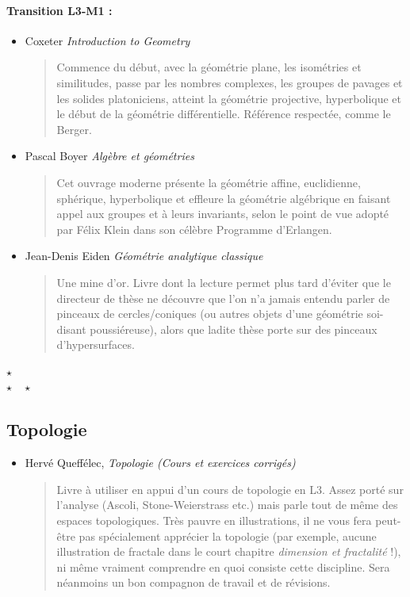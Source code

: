 \documentclass{article}
\def\separateur{\begin{center}
$\star$\\
$\star\quad\star$
\end{center}}
\begin{document}
\paragraph{Transition L3-M1 : }
\begin{itemize}
\item Coxeter \emph{Introduction to Geometry}
\begin{quote}
Commence du début, avec la géométrie plane, les isométries et similitudes, passe par les nombres complexes, les groupes de pavages et les solides platoniciens, atteint la géométrie projective, hyperbolique et le début de la géométrie différentielle. Référence respectée, comme le Berger.
\end{quote}
\item Pascal Boyer \emph{Algèbre et géométries}
\begin{quote}
Cet ouvrage moderne présente la géométrie affine, euclidienne, sphérique, hyperbolique et effleure la géométrie algébrique  en faisant appel aux groupes et à leurs invariants, selon le point de vue adopté par Félix Klein dans son célèbre \og Programme d'Erlangen\fg.
\end{quote}
\item Jean-Denis Eiden \emph{Géométrie analytique classique}
\begin{quote}
Une mine d'or. Livre dont la lecture permet plus tard d'éviter que le directeur de thèse ne découvre que l'on n'a jamais entendu parler de  pinceaux de cercles/coniques (ou autres objets d'une géométrie soi-disant \og poussiéreuse\fg), alors que ladite thèse porte sur des pinceaux d'hypersurfaces.
\end{quote}
\end{itemize}

\separateur
\subsection{Topologie}


\begin{mdframed}
\begin{itemize}
\item Hervé Queffélec, \emph{Topologie (Cours et exercices corrigés)}
\begin{quote}
Livre à utiliser en appui d'un cours de topologie en L3. 	Assez porté sur l'analyse (Ascoli, Stone-Weierstrass etc.) mais parle tout de même des espaces topologiques. Très pauvre en illustrations, il ne vous fera peut-être pas spécialement apprécier la topologie (par exemple, aucune illustration de fractale dans le court chapitre \emph{dimension et fractalité} !), ni même vraiment comprendre en quoi consiste cette discipline. Sera néanmoins un  bon compagnon de travail et de révisions.
\end{quote}
\end{itemize} 
\end{mdframed}
\end{document}
